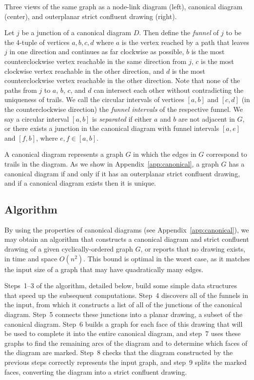 \documentclass{llncs}
\begin{document}
 {Three views of the same graph as a node-link diagram (left), canonical diagram (center), and outerplanar strict confluent drawing (right).}

Let $j$ be a junction of a canonical diagram $D$. Then
define the \emph{funnel} of $j$ to be the 4-tuple of vertices $a,b,c,d$ where $a$
is the vertex reached by a path that leaves $j$ in one direction and
continues as far clockwise as possible, $b$ is the most counterclockwise
vertex reachable in the same direction from $j$, $c$ is the most clockwise
vertex reachable in the other direction, and $d$ is the most
counterclockwise vertex reachable in the other direction. Note that
none of the paths from $j$ to $a$, $b$, $c$, and $d$ can intersect each other without contradicting the uniqueness of trails. We call the circular intervals of vertices $[a,b]$ and $[c,d]$ (in the counterclockwise direction) the \emph{funnel intervals} of the respective funnel. We say a circular interval $[a,b]$ is \emph{separated} if either $a$ and $b$ are not adjacent in $G$, or there exists a junction in the canonical diagram with funnel intervals $[a,e]$ and $[f,b]$, where $e, f \in [a,b]$.

A canonical diagram represents a graph $G$ in which the edges in $G$ correspond to trails in the diagram. As we show in Appendix~\ref {app:canonical}, a graph $G$ has a canonical diagram if and only if it has an outerplanar strict confluent drawing, and if a canonical diagram exists then it is unique.

\subsection{Algorithm}

By using the properties of canonical diagrams (see Appendix~\ref{app:canonical}), we may obtain an algorithm that constructs a canonical diagram and strict confluent drawing of a given cyclically-ordered graph $G$, or reports that no drawing exists, in time and space $O(n^2)$. This bound is optimal in the worst case, as it matches the input size of a graph that may have quadratically many edges.

Steps~1--3 of the algorithm, detailed below, build some simple data structures that speed up the subsequent computations. Step~4 discovers all of the funnels in the input, from which it constructs a list of all of the junctions of the canonical diagram. Step~5 connects these junctions into a planar drawing, a subset of the canonical diagram. Step~6 builds a graph for each face of this drawing that will be used to complete it into the entire canonical diagram, and step~7 uses these graphs to find the remaining arcs of the diagram and to determine which faces of the diagram are marked. Step~8 checks that the diagram constructed by the previous steps correctly represents the input graph, and step~9 splits the marked faces, converting the diagram into a strict confluent drawing.
\end{document}
